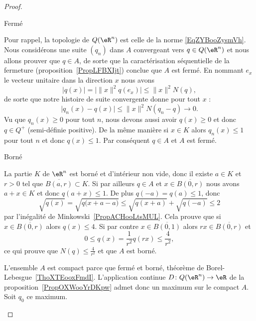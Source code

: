 \begin{proof}
\begin{subproof}
\begin{subproof}
			\item[Fermé]

			Pour rappel, la topologie de \( Q(\eR^n)\) est celle de la norme \eqref{EqZYBooZysmVh}. Nous considérons une suite \( (q_n)\) dans \( A\) convergeant vers \( q\in Q(\eR^n)\) et nous allons prouver que \( q\in A\), de sorte que la caractérisation séquentielle de la fermeture (proposition~\ref{PropLFBXIjt}) conclue que \( A\) est fermé. En nommant \( e_x\) le vecteur unitaire dans la direction \( x\) nous avons
			\begin{equation}
				\big| q(x) \big|=\big| \| x \|^2q(e_x) \big|\leq \| x \|^2N(q),
			\end{equation}
			de sorte que notre histoire de suite convergente  donne pour tout \( x\) :
			\begin{equation}
				\big| q_n(x)-q(x) \big|\leq \| x \|^2N(q_n-q)\to 0.
			\end{equation}
			Vu que \( q_n(x)\geq 0\) pour tout \( n\), nous devons aussi avoir \( q(x)\geq 0\) et donc \( q\in Q^+\) (semi-définie positive). De la même manière si \( x\in K\) alors \( q_n(x)\leq 1\) pour tout \( n\) et donc \( q(x)\leq 1\). Par conséquent \( q\in A\) et \( A\) est fermé.

			\item[Borné]

			La partie \( K\) de \( \eR^n\) est borné et d'intérieur non vide, donc il existe \( a\in K\) et \( r>0\) tel que \( \overline{ B(a,r) }\subset K\). Si par ailleurs \( q\in A\) et \( x\in\overline{ B(0,r) }\) nous avons \( a+x\in K\) et donc \( q(a+x)\leq 1\). De plus \( q(-a)=q(a)\leq 1\), donc
			\begin{equation}
				\sqrt{q(x)}=\sqrt{q\big( x+a-a \big)}\leq \sqrt{q(x+a)}+\sqrt{q(-a)}\leq 2
			\end{equation}
			par l'inégalité de Minkowski~\ref{PropACHooLtsMUL}. Cela prouve que si \( x\in\overline{ B(0,r) }\) alors \( q(x)\leq 4\). Si par contre \( x\in\overline{ B(0,1) }\) alors \( rx\in\overline{ B(0,r) } \) et
			\begin{equation}
				0\leq q(x)=\frac{1}{ r^2 }q(rx)\leq \frac{ 4 }{ r^2 },
			\end{equation}
			ce qui prouve que \( N(q)\leq \frac{ 4 }{ r^2 }\) et que \( A\) est borné.


		\end{subproof}

		L'ensemble \( A\) est compact parce que fermé et borné, théorème de Borel-Lebesgue~\ref{ThoXTEooxFmdI}. L'application continue \( D\colon Q(\eR^n)\to \eR\) de la proposition~\ref{PropOXWooYrDKpw} admet donc un maximum sur le compact \( A\). Soit \( q_0\) ce maximum.


\end{subproof}
\end{proof}
